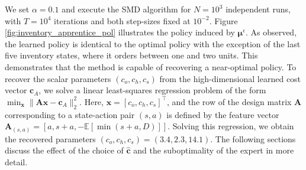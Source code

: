 \documentclass[10pt]{article} %
\def\vc{{\bm{c}}}
\def\vmu{{\bm{\mu}}}
\begin{document}
We set $\alpha=0.1$ and execute the SMD algorithm for $N=10^3$ independent runs, with $T=10^4$ iterations and both step-sizes fixed at $10^{-2}$. Figure \ref{fig:inventory_apprentice_pol} illustrates the policy induced by $\vmu^\epsilon$. As observed, the learned policy is identical to the optimal policy with the exception of the last five inventory states, where it orders between one and two units. This demonstrates that the method is capable of recovering a near-optimal policy. To recover the scalar parameters $(c_o, c_h, c_s)$ from the high-dimensional learned cost vector $\vc_A$, we solve a linear least-squares regression problem of the form $\min_{\mathbf{x}} \|\mathbf{A} \mathbf{x} - \mathbf{c}_A\|_2^2$. Here, $\mathbf{x} = [c_o, c_h, c_s]^\top$, and the row of the design matrix $\mathbf{A}$ corresponding to a state-action pair $(s,a)$ is defined by the feature vector $\mathbf{A}_{(s,a)} = [ a,  s+a, -\mathbb{E}[\min(s+a, D)]]$. Solving this regression, we obtain the recovered parameters $(c_o, c_h, c_s) = (3.4, 2.3, 14.1)$. The following sections discuss the effect of the choice of $\hat{\vc}$ and the suboptimality of the expert in more detail.
\end{document}
